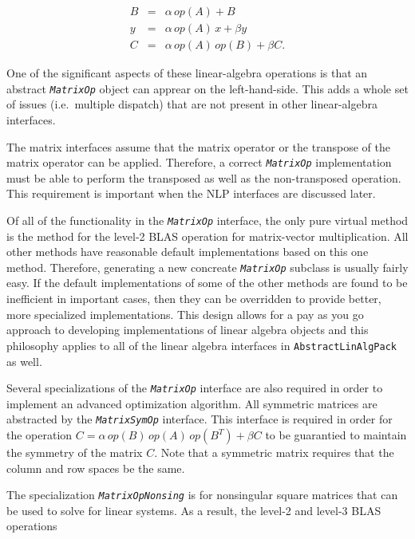 \documentclass[pdf,ps2pdf,11pt]{SANDreport}
\begin{document}
{\bsinglespace
\begin{eqnarray*}
B & = & \alpha \, op(A) + B \\
y & = & \alpha \, op(A) \,  x + \beta y \\
C & = & \alpha \, op(A) \, op(B) + \beta C.
\end{eqnarray*}
\esinglespace}

One of the significant aspects of these linear-algebra operations is
that an abstract {}\texttt{\textit{Matrix\-Op}} object can apprear on
the left-hand-side.  This adds a whole set of issues (i.e.\ multiple
dispatch) that are not present in other linear-algebra interfaces.

The matrix interfaces assume that the matrix operator or the transpose
of the matrix operator can be applied.  Therefore, a correct
{}\texttt{\textit{Matrix\-Op}} implementation must be able to perform
the transposed as well as the non-transposed operation.  This
requirement is important when the NLP interfaces are discussed later.

Of all of the functionality in the {}\texttt{\textit{Matrix\-Op}}
interface, the only pure virtual method is the method for the level-2
BLAS operation for matrix-vector multiplication.  All other methods
have reasonable default implementations based on this one method.
Therefore, generating a new concreate {}\texttt{\textit{Matrix\-Op}}
subclass is usually fairly easy.  If the default implementations of
some of the other methods are found to be inefficient in important
cases, then they can be overridden to provide better, more specialized
implementations.  This design allows for a pay as you go approach to
developing implementations of linear algebra objects and this
philosophy applies to all of the linear algebra interfaces in
{}\texttt{Abstract\-Lin\-Alg\-Pack} as well.

Several specializations of the {}\texttt{\textit{Matrix\-Op}} interface are
also required in order to implement an advanced optimization algorithm.  All
symmetric matrices are abstracted by the {}\texttt{\textit{Matrix\-Sym\-Op}}
interface.  This interface is required in order for the operation $C =
\alpha\,op(B)\,op(A)\,op(B^T) + \beta C$ to be guarantied to maintain the
symmetry of the matrix $C$.  Note that a symmetric matrix requires that the
column and row spaces be the same.

The specialization {}\texttt{\textit{Matrix\-Op\-Nonsing}} is
for nonsingular square matrices that can be used to solve for linear
systems.  As a result, the level-2 and level-3 BLAS operations
\end{document}
